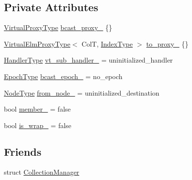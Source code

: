 \subsection*{Private Attributes}
\begin{DoxyCompactItemize}
\item 
\hyperlink{namespacevt_a1b417dd5d684f045bb58a0ede70045ac}{Virtual\+Proxy\+Type} \hyperlink{structvt_1_1vrt_1_1collection_1_1_collection_message_a7b1563ec7a2d15faba3b252304beefb6}{bcast\+\_\+proxy\+\_\+} \{\}
\item 
\hyperlink{namespacevt_1_1vrt_a620a5c8c59d13e513f690c74b4af516f}{Virtual\+Elm\+Proxy\+Type}$<$ ColT, \hyperlink{structvt_1_1vrt_1_1collection_1_1_collection_message_a324978c38e67d1bfa86c8db172e77594}{Index\+Type} $>$ \hyperlink{structvt_1_1vrt_1_1collection_1_1_collection_message_ad2fbe6becd494f4983479600010ec39b}{to\+\_\+proxy\+\_\+} \{\}
\item 
\hyperlink{namespacevt_af64846b57dfcaf104da3ef6967917573}{Handler\+Type} \hyperlink{structvt_1_1vrt_1_1collection_1_1_collection_message_a6886f8da35617183db4aa87b259ec7df}{vt\+\_\+sub\+\_\+handler\+\_\+} = uninitialized\+\_\+handler
\item 
\hyperlink{namespacevt_a985a5adf291c34a3ca263b3378388236}{Epoch\+Type} \hyperlink{structvt_1_1vrt_1_1collection_1_1_collection_message_a60590aa9601e302e944e57a28d6d6600}{bcast\+\_\+epoch\+\_\+} = no\+\_\+epoch
\item 
\hyperlink{namespacevt_a866da9d0efc19c0a1ce79e9e492f47e2}{Node\+Type} \hyperlink{structvt_1_1vrt_1_1collection_1_1_collection_message_aa129673e8d91d5e3e662f15ae0d8d5fa}{from\+\_\+node\+\_\+} = uninitialized\+\_\+destination
\item 
bool \hyperlink{structvt_1_1vrt_1_1collection_1_1_collection_message_a9fc2e8cebdc2165d4d7e43a2b1fdb1b7}{member\+\_\+} = false
\item 
bool \hyperlink{structvt_1_1vrt_1_1collection_1_1_collection_message_a026bbaa62fe0cb249e575792a4dfe1b6}{is\+\_\+wrap\+\_\+} = false
\end{DoxyCompactItemize}
\subsection*{Friends}
\begin{DoxyCompactItemize}
\item 
struct \hyperlink{structvt_1_1vrt_1_1collection_1_1_collection_message_af9288b1963f434a90b307b5305a49510}{Collection\+Manager}
\end{DoxyCompactItemize}


